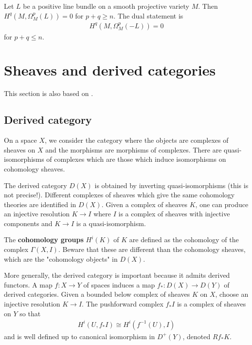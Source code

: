 \documentclass[12pt]{article}
\begin{document}
\begin{theorem}
     Let $L$ be a positive line bundle on a smooth projective variety $M$.
    Then $H^q(M,\Omega^p_M(L)) = 0$ for $p+q \geq n$. The dual statement is \begin{align*}
        H^q(M,\Omega^p_M(-L)) = 0
    \end{align*} for $p+q \leq n$.
\end{theorem}


\section{Sheaves and derived categories}
This section is also based on \cite{cataldo-migliorini}.

\subsection{Derived category}
On a space $X$, we consider the category where the objects are
complexes of sheaves on $X$ and the morphisms are morphisms of complexes.
There are quasi-isomorphisms of complexes which are those which induce isomorphisms on
cohomology sheaves.

The derived category $D(X)$ is obtained by inverting quasi-isomorphisms (this is not precise!).
Different complexes of sheaves which give the same cohomology theories are identified in $D(X)$.
Given a complex of sheaves $K$, one can produce an injective resolution $K\to I$ where $I$ is a
complex of sheaves with injective components and $K\to I$ is a quasi-isomorphism.

\begin{definition}
    The \textbf{cohomology groups} $H^i(K)$ of $K$ are defined as the cohomology of the complex $\Gamma(X,I)$. Beware that these are different than the cohomology sheaves, which are the "cohomology objects" in $D(X)$.
\end{definition}

More generally, the derived category is important because it admits derived functors. A map
$f:X\to Y$ of spaces induces a map $f_*:D(X)\to D(Y)$ of derived categories. Given
a bounded below complex of sheaves $K$ on $X$, choose an injective resolution $K\to I$.
The pushforward complex $f_*I$ is a complex of sheaves on $Y$ so that \begin{align*}
    H^i(U,f_*I) \cong H^i(f^{-1}(U),I)
\end{align*}
and is well defined up to canonical isomorphism in $D^+(Y)$, denoted $Rf_*K$.
\end{document}
